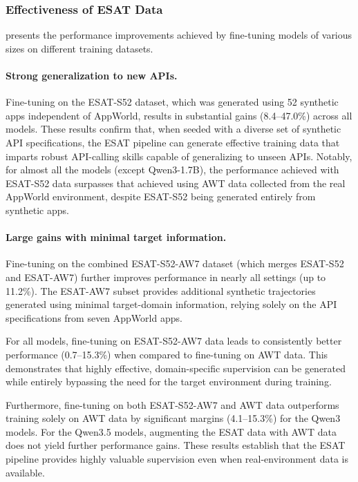 \subsubsection{Effectiveness of \textsc{ESAT} Data} 
 presents the performance improvements achieved by fine-tuning models of various sizes on different training datasets.

\paragraph{Strong generalization to new APIs.} Fine-tuning on the \textsc{ESAT}-S52 dataset, which was generated using 52 synthetic apps independent of AppWorld, results in substantial gains (8.4--47.0\%) across all models. These results confirm that, when seeded with a diverse set of synthetic API specifications, the \textsc{ESAT} pipeline can generate effective training data that imparts robust API-calling skills capable of generalizing to unseen APIs. Notably, for almost all the models (except Qwen3-1.7B), the performance achieved with \textsc{ESAT}-S52 data surpasses that achieved using AWT data collected from the real AppWorld environment, despite \textsc{ESAT}-S52 being generated entirely from synthetic apps.



\paragraph{Large gains with minimal target information.}
Fine-tuning on the combined \textsc{ESAT}-S52-AW7 dataset (which merges \textsc{ESAT}-S52 and \textsc{ESAT}-AW7) further improves performance in nearly all settings (up to 11.2\%). The \textsc{ESAT}-AW7 subset provides additional synthetic trajectories generated using minimal target-domain information, relying solely on the API specifications from seven AppWorld apps. 

For all models, fine-tuning on \textsc{ESAT}-S52-AW7 data leads to consistently better performance (0.7--15.3\%) when compared to fine-tuning on AWT data. This demonstrates that highly effective, domain-specific supervision can be generated while entirely bypassing the need for the target environment during training.

Furthermore, fine-tuning on both \textsc{ESAT}-S52-AW7 and AWT data outperforms training solely on AWT data by significant margins (4.1--15.3\%) for the Qwen3 models. For the Qwen3.5 models, augmenting the \textsc{ESAT} data with AWT data does not yield further performance gains. These results establish that the \textsc{ESAT} pipeline provides highly valuable supervision even when real-environment data is available.


